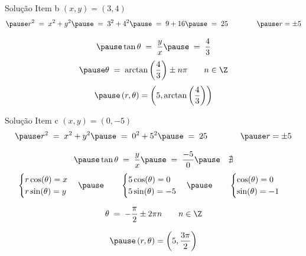 \begin{resolution}{Solução Item b}
   \((x, y) = \left(3, 4\right)\)
  \[
    \pause r^2 \;=\; x^2 + y^2
    \pause \;=\; 3^2 + 4^2
    \pause \;=\; 9 + 16
    \pause \;=\; 25
    \qquad\qquad
    \pause r = \pm 5
  \]

  \[
    \pause \tan\theta \;=\; \frac{y}{x}
    \pause            \;=\; \frac{4}{3}
  \]
  \[
    \pause \theta \;=\; \arctan\left(\frac{4}{3}\right) \pm n\pi
    \qquad n\in \Z
  \]
  \[
    \pause
    \left(r, \theta\right) =
    \left(5, \arctan\left(\frac{4}{3}\right)\right)
  \]
\end{resolution}

\begin{resolution}{Solução Item c}
  \((x, y) = \left(0, -5\right)\)
  \[
    \pause r^2 \;=\; x^2 + y^2
    \pause \;=\; 0^2 + 5^2
    \pause \;=\; 25
    \qquad\qquad
    \pause r = \pm 5
  \]

  \[
    \pause \tan\theta \;=\; \frac{y}{x}
    \pause            \;=\; \frac{-5}{0}
    \pause            \quad \nexists
  \]
  \pause
  \[
    \begin{cases}
      r\cos(\theta) = x\\
      r\sin(\theta) = y
    \end{cases}
    \pause\qquad
    \begin{cases}
      5\cos(\theta) = 0 \\
      5\sin(\theta) = -5
    \end{cases}
    \pause\qquad
    \begin{cases}
      \cos(\theta) = 0 \\
      \sin(\theta) = -1
    \end{cases}
  \]

  \pause
  \[
    \theta \;=\; -\frac{\pi}{2} \pm 2\pi n
    \qquad n\in \Z
  \]

  \[
    \pause
    \left(r, \theta\right) =
    \left(5, \dfrac{3\pi}{2}\right)
  \]
\end{resolution}

